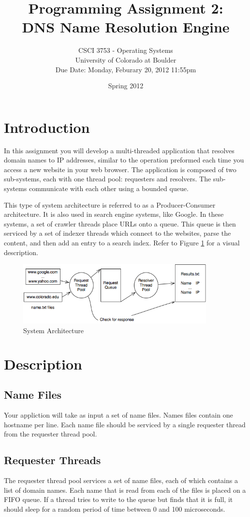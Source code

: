 \documentclass[12pt]{article}
\title{Programming Assignment 2:\\DNS Name Resolution Engine}
\author{
  CSCI 3753 - Operating Systems\\
  University of Colorado at Boulder\\
  Due Date:  Monday, Feburary 20, 2012 11:55pm
}
\date{Spring 2012}
\begin{document}
\maketitle

\section{Introduction}
In this assignment you will develop a multi-threaded
application that resolves domain names to IP addresses, similar to the
operation preformed each time you access a new website in your web browser.
The application is composed of two sub-systems, each with one thread pool:
requesters and resolvers. The sub-systems
communicate with each other using a bounded queue.

This type of system architecture is referred to as a Producer-Consumer
architecture. It is also used in search engine
systems, like Google. In these systems, a set of crawler threads place
URLs onto a queue. This queue is then serviced by a set of indexer
threads which connect to the websites, parse the content, and then add
an entry to a search index. Refer to Figure \ref{fig:sys} for a
visual description.

\begin{figure}[htbp]
  \begin{center}
    \includegraphics[width=100mm]{pa2.png}
    \caption{System Architecture}
    \label{fig:sys}
  \end{center}
\end{figure}

\section{Description}
\subsection{Name Files}
Your appliction will take as input a set of name files. Names files
contain one hostname per line. Each name file should be serviced by a
single requester thread from the requester thread pool.

\subsection{Requester Threads}
The requester thread pool
services a set of name files, each of which contains a list of domain
names. Each name that is
read from each of the files is placed on a FIFO queue.
If a thread tries to write to the
queue but finds that it is full, it should sleep for a random period
of time between 0 and 100 microseconds.
\end{document}
